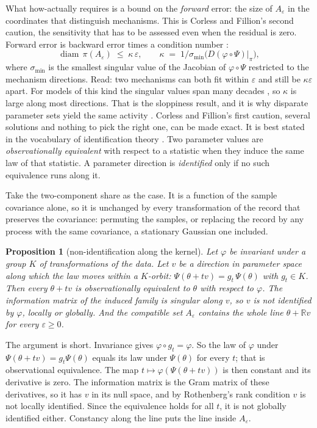 \documentclass[11pt]{article}
\newtheorem{proposition}{Proposition}
\theoremstyle{definition}\newtheorem{observation}{Observation}
\theoremstyle{remark}\newtheorem{remark}{Remark}
\begin{document}
What how-actually requires is a bound on the \emph{forward} error: the size of $A_\varepsilon$ in the coordinates that distinguish mechanisms. This is Corless and Fillion's second caution, the sensitivity that has to be assessed even when the residual is zero. Forward error is backward error times a condition number \parencite{higham2002,corless2016}:
\begin{equation}
\operatorname{diam}\,\pi(A_{\varepsilon})\;\le\;\kappa\,\varepsilon,
\qquad
\kappa \;=\; 1\big/\sigma_{\min}\!\bigl(D(\varphi\circ\Psi)\big|_{\pi}\bigr),
\label{eq:forward}
\end{equation}
where $\sigma_{\min}$ is the smallest singular value of the Jacobian of $\varphi\circ\Psi$ restricted to the mechanism directions. Read: two mechanisms can both fit within $\varepsilon$ and still be $\kappa\varepsilon$ apart. For models of this kind the singular values span many decades \parencite{gutenkunst2007,machta2013,transtrum2015}, so $\kappa$ is large along most directions. That is the sloppiness result, and it is why disparate parameter sets yield the same activity \parencite{prinz2004}. Corless and Fillion's first caution, several solutions and nothing to pick the right one, can be made exact. It is best stated in the vocabulary of identification theory \parencite{rothenberg1971}. Two parameter values are \emph{observationally equivalent} with respect to a statistic when they induce the same law of that statistic. A parameter direction is \emph{identified} only if no such equivalence runs along it.

Take the two-component share as the case. It is a function of the sample covariance alone, so it is unchanged by every transformation of the record that preserves the covariance: permuting the samples, or replacing the record by any process with the same covariance, a stationary Gaussian one included.

\begin{proposition}[non-identification along the kernel]
Let $\varphi$ be invariant under a group $K$ of transformations of the data. Let $v$ be a direction in parameter space along which the law moves within a $K$-orbit: $\Psi(\theta+tv)=g_t\,\Psi(\theta)$ with $g_t\in K$. Then every $\theta+tv$ is observationally equivalent to $\theta$ with respect to $\varphi$. The information matrix of the induced family is singular along $v$, so $v$ is not identified by $\varphi$, locally or globally. And the compatible set $A_\varepsilon$ contains the whole line $\theta+\mathbb{R}v$ for every $\varepsilon\ge 0$.
\end{proposition}
The argument is short. Invariance gives $\varphi\circ g_t=\varphi$. So the law of $\varphi$ under $\Psi(\theta+tv)=g_t\Psi(\theta)$ equals its law under $\Psi(\theta)$ for every $t$; that is observational equivalence. The map $t\mapsto\varphi(\Psi(\theta+tv))$ is then constant and its derivative is zero. The information matrix is the Gram matrix of these derivatives, so it has $v$ in its null space, and by Rothenberg's rank condition $v$ is not locally identified. Since the equivalence holds for all $t$, it is not globally identified either. Constancy along the line puts the line inside $A_\varepsilon$.
\end{document}
